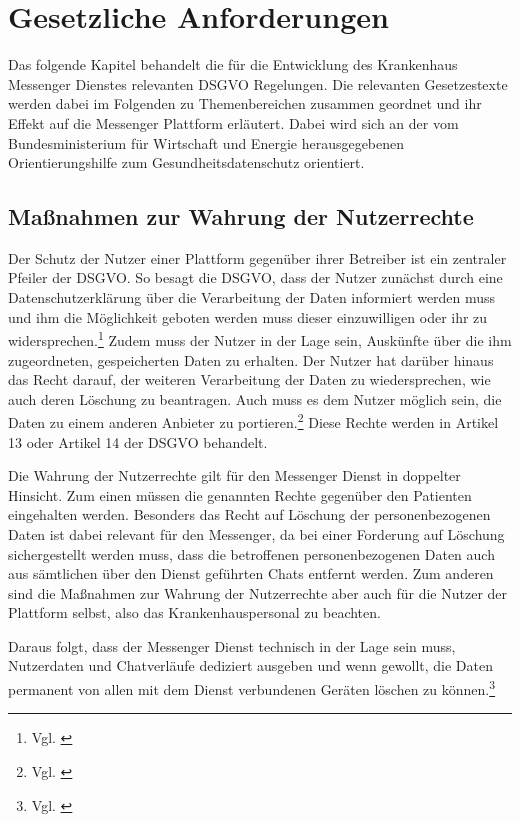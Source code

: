 \section{Gesetzliche Anforderungen}\label{section:dsgvo}
Das folgende Kapitel behandelt die für die Entwicklung des Krankenhaus Messenger Dienstes relevanten DSGVO Regelungen. Die relevanten Gesetzestexte werden dabei im Folgenden zu Themenbereichen zusammen geordnet und ihr Effekt auf die Messenger Plattform erläutert. Dabei wird sich an der vom Bundesministerium für Wirtschaft und Energie herausgegebenen Orientierungshilfe zum Gesundheitsdatenschutz orientiert.

\subsection{Maßnahmen zur Wahrung der Nutzerrechte}\label{subsection:mzwdn}
Der Schutz der Nutzer einer Plattform gegenüber ihrer Betreiber ist ein zentraler Pfeiler der DSGVO. So besagt die DSGVO, dass der Nutzer zunächst durch eine Datenschutzerklärung über die Verarbeitung der Daten informiert werden muss und ihm die Möglichkeit geboten werden muss dieser einzuwilligen oder ihr zu widersprechen.\footnote{Vgl. \cite[S. 3]{OrientierungshilfezumGesundheitsdatenschutz2018}} Zudem muss der Nutzer in der Lage sein, Auskünfte über die ihm zugeordneten, gespeicherten Daten zu erhalten. Der Nutzer hat darüber hinaus das Recht darauf, der weiteren Verarbeitung der Daten zu wiedersprechen, wie auch deren Löschung zu beantragen. Auch muss es dem Nutzer möglich sein, die Daten zu einem anderen Anbieter zu portieren.\footnote{Vgl. \cite[S. 30 ff.]{OrientierungshilfezumGesundheitsdatenschutz2018}} Diese Rechte werden in Artikel 13 oder Artikel 14 der DSGVO behandelt.

Die Wahrung der Nutzerrechte gilt für den Messenger Dienst in doppelter Hinsicht.
Zum einen müssen die genannten Rechte gegenüber den Patienten eingehalten werden. Besonders das Recht auf Löschung der personenbezogenen Daten ist dabei relevant für den Messenger, da bei einer Forderung auf Löschung sichergestellt werden muss, dass die betroffenen personenbezogenen Daten auch aus sämtlichen über den Dienst geführten Chats entfernt werden. Zum anderen sind die Maßnahmen zur Wahrung der Nutzerrechte aber auch für die Nutzer der Plattform selbst, also das Krankenhauspersonal zu beachten.

Daraus folgt, dass der Messenger Dienst technisch in der Lage sein muss, Nutzerdaten und Chatverläufe dediziert ausgeben und wenn gewollt, die Daten permanent von allen mit dem Dienst verbundenen Geräten löschen zu können.\footnote{Vgl. \cite[S. 36 ff.]{OrientierungshilfezumGesundheitsdatenschutz2018}}

